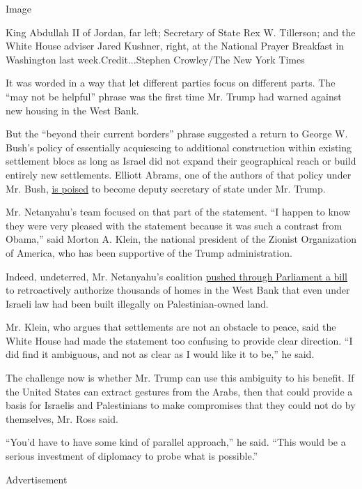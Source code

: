 Image

King Abdullah II of Jordan, far left; Secretary of State Rex W.
Tillerson; and the White House adviser Jared Kushner, right, at the
National Prayer Breakfast in Washington last week.Credit...Stephen
Crowley/The New York Times

It was worded in a way that let different parties focus on different
parts. The ``may not be helpful'' phrase was the first time Mr. Trump
had warned against new housing in the West Bank.

But the ``beyond their current borders'' phrase suggested a return to
George W. Bush's policy of essentially acquiescing to additional
construction within existing settlement blocs as long as Israel did not
expand their geographical reach or build entirely new settlements.
Elliott Abrams, one of the authors of that policy under Mr. Bush,
\href{https://www.nytimes.com/2017/02/06/us/politics/donald-trump-elliott-abrams.html}{is
poised} to become deputy secretary of state under Mr. Trump.

Mr. Netanyahu's team focused on that part of the statement. ``I happen
to know they were very pleased with the statement because it was such a
contrast from Obama,'' said Morton A. Klein, the national president of
the Zionist Organization of America, who has been supportive of the
Trump administration.

Indeed, undeterred, Mr. Netanyahu's coalition
\href{https://www.nytimes.com/2017/02/06/world/middleeast/israel-settlement-law-palestinians-west-bank.html}{pushed
through Parliament a bill} to retroactively authorize thousands of homes
in the West Bank that even under Israeli law had been built illegally on
Palestinian-owned land.

Mr. Klein, who argues that settlements are not an obstacle to peace,
said the White House had made the statement too confusing to provide
clear direction. ``I did find it ambiguous, and not as clear as I would
like it to be,'' he said.

The challenge now is whether Mr. Trump can use this ambiguity to his
benefit. If the United States can extract gestures from the Arabs, then
that could provide a basis for Israelis and Palestinians to make
compromises that they could not do by themselves, Mr. Ross said.

``You'd have to have some kind of parallel approach,'' he said. ``This
would be a serious investment of diplomacy to probe what is possible.''

Advertisement

